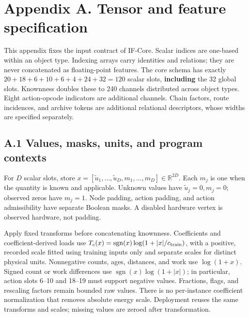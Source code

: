 \documentclass[10pt,a4paper]{article}
\begin{document}
\hypertarget{appendix-a.-tensor-and-feature-specification}{%
\section*{Appendix A. Tensor and feature
specification}\label{appendix-a.-tensor-and-feature-specification}}

This appendix fixes the input contract of IF-Core. Scalar indices are
one-based within an object type. Indexing arrays carry identities and
relations; they are never concatenated as floating-point features. The
core schema has exactly \(20+18+6+10+6+4+24+32=120\) scalar slots,
\textbf{including} the 32 global slots. Knownness doubles these to 240
channels distributed across object types. Eight action-opcode indicators
are additional channels. Chain factors, route incidences, and archive
tokens are additional relational descriptors, whose widths are specified
separately.

\hypertarget{a.1-values-masks-units-and-program-contexts}{%
\subsection*{A.1 Values, masks, units, and program
contexts}\label{a.1-values-masks-units-and-program-contexts}}

For \(D\) scalar slots, store
\(x=[\widetilde u_1,\ldots,\widetilde u_D,m_1,\ldots,m_D]\in\mathbb R^{2D}\).
Each \(m_j\) is one when the quantity is known and applicable. Unknown
values have \(\widetilde u_j=0,m_j=0\); observed zeros have \(m_j=1\).
Node padding, action padding, and action admissibility have separate
Boolean masks. A disabled hardware vertex is observed hardware, not
padding.

Apply fixed transforms before concatenating knownness. Coefficients and
coefficient-derived loads use
\(T_c(x)=\operatorname{sgn}(x)\log(1+|x|/c_{\rm train})\), with a
positive, recorded scale fitted using training inputs only and separate
scales for distinct physical units. Nonnegative counts, ages, distances,
and work use \(\log(1+x)\). Signed count or work differences use
\(\operatorname{sgn}(x)\log(1+|x|)\); in particular, action slots 6--10
and 18--19 must support negative values. Fractions, flags, and rescaling
factors remain bounded raw values. There is no per-instance coefficient
normalization that removes absolute energy scale. Deployment reuses the
same transforms and scales; missing values are zeroed after
transformation.
\end{document}

